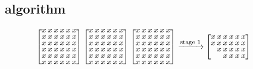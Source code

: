 \documentclass[final,leqno,onefignum,onetabnum]{siamltexmm}
\begin{document}
\subsection{\Psd\ algorithm}
\label{subsec:psd}
\begin{figure}
  \centering
  \begin{align*}
    \small
    \setlength\arraycolsep{1pt}
    \renewcommand{\arraystretch}{0.7}
    \begin{bmatrix}
      x & x & x & x & x & x \\
      x & x & x & x & x & x \\
      x & x & x & x & x & x \\
      x & x & x & x & x & x \\
      x & x & x & x & x & x \\
      x & x & x & x & x & x \\
    \end{bmatrix}
    \begin{bmatrix}
      x & x & x & x & x & x \\
      x & x & x & x & x & x \\
      x & x & x & x & x & x \\
      x & x & x & x & x & x \\
      x & x & x & x & x & x \\
      x & x & x & x & x & x \\
    \end{bmatrix}
    \begin{bmatrix}
      x & x & x & x & x & x \\
      x & x & x & x & x & x \\
      x & x & x & x & x & x \\
      x & x & x & x & x & x \\
      x & x & x & x & x & x \\
      x & x & x & x & x & x \\
    \end{bmatrix}
        & \xrightarrow{\normalsize \text{stage 1}}
            \small
            \setlength\arraycolsep{1pt}
            \renewcommand{\arraystretch}{0.7}
            \begin{bmatrix}
              x & x & x & x & x & x \\
              x & x & x & x & x & x \\
              & x & x & x & x & x \\
              &   & x & x & x & x \\

\end{bmatrix}
\end{align*}
\end{figure}
\end{document}

